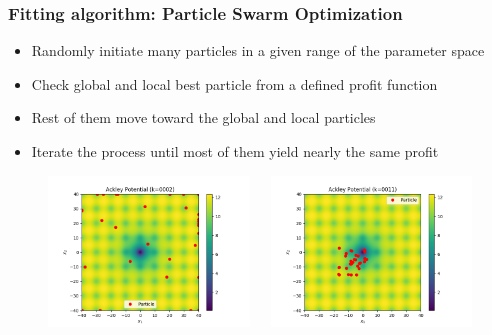 \documentclass{beamer}
\begin{document}
\begin{frame}\frametitle{Fitting algorithm: Particle Swarm Optimization}
\begin{itemize}
  \item Randomly initiate many particles in a given range of the parameter space
  \item Check global and local best particle from a defined profit function
  \item Rest of them move toward the global and local particles
  \item Iterate the process until most of them yield nearly the same profit
\end{itemize}
\begin{figure}
\begin{columns}
  \begin{column}{0.34\textwidth}
    \includegraphics[width=\columnwidth]{figure/particle_swarm0002}
  \end{column}
  \begin{column}{0.34\textwidth}
  \includegraphics[width=\columnwidth]{figure/particle_swarm0011}

\end{column}
\end{columns}
\end{figure}
\end{frame}
\end{document}
